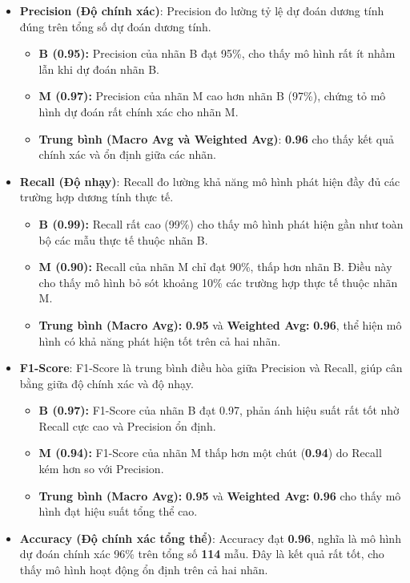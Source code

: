 \begin{itemize}
	\item \textbf{Precision (Độ chính xác)}:  
	Precision đo lường tỷ lệ dự đoán dương tính đúng trên tổng số dự đoán dương tính.
	\begin{itemize}
		\item \textbf{B (0.95):} Precision của nhãn B đạt 95\%, cho thấy mô hình rất ít nhầm lẫn khi dự đoán nhãn B.  
		\item \textbf{M (0.97):} Precision của nhãn M cao hơn nhãn B (97\%), chứng tỏ mô hình dự đoán rất chính xác cho nhãn M.
		\item \textbf{Trung bình (Macro Avg và Weighted Avg)}: \textbf{0.96} cho thấy kết quả chính xác và ổn định giữa các nhãn.
	\end{itemize}
	
	\item \textbf{Recall (Độ nhạy)}:  
	Recall đo lường khả năng mô hình phát hiện đầy đủ các trường hợp dương tính thực tế.
	\begin{itemize}
		\item \textbf{B (0.99):} Recall rất cao (99\%) cho thấy mô hình phát hiện gần như toàn bộ các mẫu thực tế thuộc nhãn B.  
		\item \textbf{M (0.90):} Recall của nhãn M chỉ đạt 90\%, thấp hơn nhãn B. Điều này cho thấy mô hình bỏ sót khoảng 10\% các trường hợp thực tế thuộc nhãn M.
		\item \textbf{Trung bình (Macro Avg):} \textbf{0.95} và \textbf{Weighted Avg:} \textbf{0.96}, thể hiện mô hình có khả năng phát hiện tốt trên cả hai nhãn.
	\end{itemize}
	
	\item \textbf{F1-Score}:  
	F1-Score là trung bình điều hòa giữa Precision và Recall, giúp cân bằng giữa độ chính xác và độ nhạy.
	\begin{itemize}
		\item \textbf{B (0.97):} F1-Score của nhãn B đạt 0.97, phản ánh hiệu suất rất tốt nhờ Recall cực cao và Precision ổn định.  
		\item \textbf{M (0.94):} F1-Score của nhãn M thấp hơn một chút (\textbf{0.94}) do Recall kém hơn so với Precision.  
		\item \textbf{Trung bình (Macro Avg):} \textbf{0.95} và \textbf{Weighted Avg:} \textbf{0.96} cho thấy mô hình đạt hiệu suất tổng thể cao.
	\end{itemize}
	
	\item \textbf{Accuracy (Độ chính xác tổng thể)}:  
	Accuracy đạt \textbf{0.96}, nghĩa là mô hình dự đoán chính xác 96\% trên tổng số \textbf{114} mẫu. Đây là kết quả rất tốt, cho thấy mô hình hoạt động ổn định trên cả hai nhãn.
\end{itemize}
